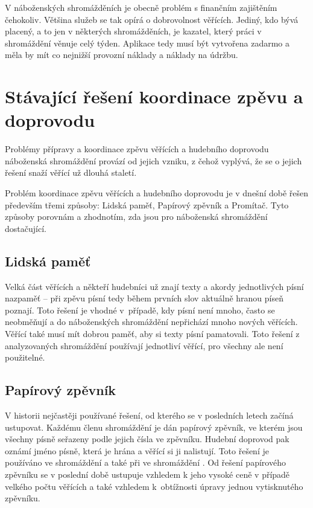 V náboženských shromážděních je obecně problém s finančním zajištěním čehokoliv. Většina služeb se tak opírá o dobrovolnost věřících. Jediný, kdo bývá placený, a to jen v některých shromážděních, je kazatel, který práci v shromáždění věnuje celý týden. Aplikace tedy musí být vytvořena zadarmo a měla by mít co nejnižší provozní náklady a náklady na údržbu.

\section{Stávající řešení koordinace zpěvu a doprovodu}

Problémy přípravy a koordinace zpěvu věřících a hudebního doprovodu náboženská shromáždění provází od jejich vzniku, z čehož vyplývá, že se o jejich řešení snaží věřící už dlouhá staletí.

Problém koordinace zpěvu věřících a hudebního doprovodu je v dnešní době řešen především třemi způsoby: Lidská paměť, Papírový zpěvník a Promítač. Tyto způsoby porovnám a zhodnotím, zda jsou pro náboženská shromáždění dostačující.

\subsection{Lidská paměť}

Velká část věřících a někteří hudebníci už znají texty a akordy jednotlivých písní nazpaměť -- při zpěvu písní tedy během prvních slov aktuálně hranou píseň poznají. Toto řešení je vhodné v~případě, kdy písní není mnoho, často se neobměňují a do náboženských shromáždění nepřichází mnoho nových věřících. Věřící také musí mít dobrou paměť, aby si texty písní pamatovali. Toto řešení z analyzovaných shromáždění používají jednotliví věřící, pro všechny ale není použitelné.

\subsection{Papírový zpěvník}

V historii nejčastěji používané řešení, od kterého se v posledních letech začíná ustupovat. Každé\-mu členu shromáždění je dán papírový zpěvník, ve kterém jsou všechny písně seřazeny podle jejich čísla ve zpěvníku. Hudební doprovod pak oznámí jméno písně, která je hrána a věřící si ji nalistují. Toto řešení je používáno ve shromáždění  a také při  ve shromáždění . Od řešení papírového zpěvníku se v poslední době ustupuje vzhledem k jeho vysoké ceně v případě velkého počtu věřících a také vzhledem k~obtížnosti úpravy jednou vytisknutého zpěvníku.

